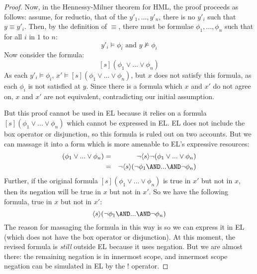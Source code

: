 \begin{proof}
Now, in the Hennessy-Milner theorem for HML, the proof proceeds as follows:
assume, for reductio, that of the $y'_1, ..., y'_n$, there is no $y'_i$ such that $y \equiv y'_i$.
Then, by the definition of $\equiv$, there must be formulae $\phi_1, ..., \phi_n$ such that for all $i$ in $1$ to $n$:
\[
y'_i \models \phi_i \mbox{ and } y \nvDash \phi_i
\]
Now consider the formula:
\[
[s] (\phi_1 \lor ... \lor \phi_n)
\]
As each $y'_i \models \phi_i$, $x' \models [s] (\phi_1 \lor ... \lor \phi_n)$, but $x$ does not satisfy this formula, as each $\phi_i$ is not satisfied at $y$.
Since there is a formula which $x$ and $x'$ do not agree on, $x$ and $x'$ are not equivalent, contradicting our initial assumption.

But this proof cannot be used in EL because it relies on a formula $[s] (\phi_1 \lor ... \lor \phi_n)$ which cannot be expressed in EL. 
EL does not include the box operator or disjunction, so this formula is ruled out on two accounts.
But we can massage it into a form which is more amenable to EL's expressive resources:
\begin{eqnarray}
[s] (\phi_1 \lor ... \lor \phi_n) & = & \neg \langle s \rangle \neg (\phi_1 \lor ... \lor \phi_n) \nonumber \\
	& = & \neg \langle s \rangle (\neg \phi_1\AND ... \AND \neg \phi_n) \nonumber
\end{eqnarray}
Further, if the original formula $[s] (\phi_1 \lor ... \lor \phi_n)$ is true in $x'$ but not in $x$, then its negation will be true in $x$ but not in $x'$. 
So we have the following formula, true in $x$ but not in $x'$:
\[
 \langle s \rangle (\neg \phi_1\AND ... \AND \neg \phi_n)
 \]
The reason for massaging the formula in this way is so we can express it in EL (which does not have the box operator or disjunction).
At this moment, the revised formula is \emph{still} outside EL because it uses negation. 
But we are almost there: the remaining negation is in innermost scope, and innermost scope negation can be simulated in EL by the $!$ operator. 


\end{proof}
